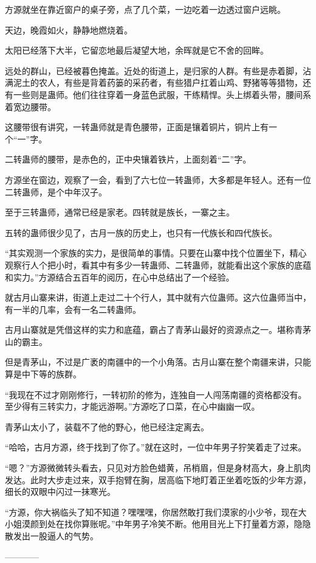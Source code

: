 \begin{this_body}
方源就坐在靠近窗户的桌子旁，点了几个菜，一边吃着一边透过窗户远眺。

天边，晚霞如火，静静地燃烧着。

太阳已经落下大半，它留恋地最后凝望大地，余晖就是它不舍的回眸。

远处的群山，已经被暮色掩盖。近处的街道上，是归家的人群。有些是赤着脚，沾满泥土的农人，有些是背着药篓的采药者，有些猎户扛着山鸡、野猪等等猎物，还有一些则是蛊师。他们往往穿着一身蓝色武服，干练精悍。头上绑着头带，腰间系着宽边腰带。

这腰带很有讲究，一转蛊师就是青色腰带，正面是镶着铜片，铜片上有一个“一”字。

二转蛊师的腰带，是赤色的，正中央镶着铁片，上面刻着“二”字。

方源坐在窗边，观察了一会，看到了六七位一转蛊师，大多都是年轻人。还有一位二转蛊师，是个中年汉子。

至于三转蛊师，通常已经是家老。四转就是族长，一寨之主。

五转的蛊师很少见了，古月一族的历史上，也只有一代族长和四代族长。

“其实观测一个家族的实力，是很简单的事情。只要在山寨中找个位置坐下，精心观察行人个把小时，看其中有多少一转蛊师、二转蛊师，就能看出这个家族的底蕴和实力。”方源结合五百年的阅历，在心中总结出了一个经验。

就古月山寨来讲，街道上走过二十个行人，其中就有六位蛊师。这六位蛊师当中，有一半的几率，会有一名二转蛊师。

古月山寨就是凭借这样的实力和底蕴，霸占了青茅山最好的资源点之一。堪称青茅山的霸主。

但是青茅山，不过是广袤的南疆中的一个小角落。古月山寨在整个南疆来讲，只能算是中下等的族群。

“我现在不过才刚刚修行，一转初阶的修为，连独自一人闯荡南疆的资格都没有。至少得有三转实力，才能远游啊。”方源吃了口菜，在心中幽幽一叹。

青茅山太小了，装载不了他的野心，他已经注定离去。

“哈哈，古月方源，终于找到了你了。”就在这时，一位中年男子狞笑着走了过来。

“嗯？”方源微微转头看去，只见对方脸色蜡黄，吊梢眉，但是身材高大，身上肌肉发达。此时大步走过来，双手抱臂在胸，居高临下地盯着正坐着吃饭的少年方源，细长的双眼中闪过一抹寒光。

“方源，你大祸临头了知不知道？嘿嘿嘿，你居然敢打我们漠家的小少爷，现在大小姐漠颜到处在找你算账呢。”中年男子冷笑不断。他用目光上下打量着方源，隐隐散发出一股逼人的气势。

------------

\end{this_body}

